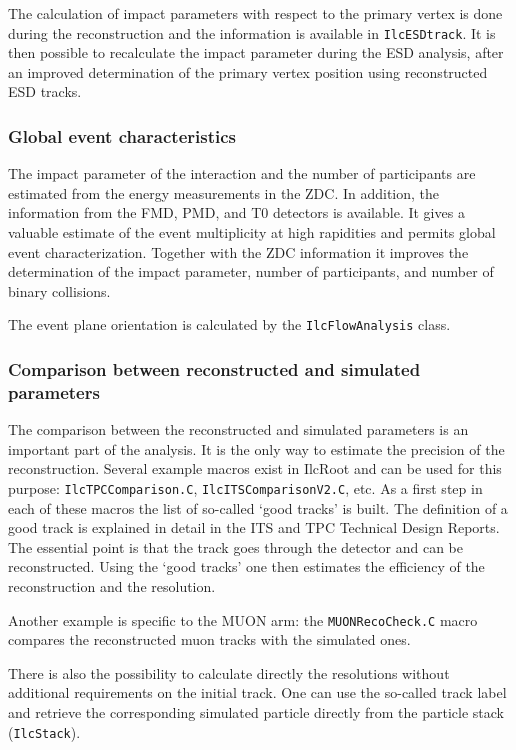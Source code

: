 \documentclass[12pt,a4paper,twoside]{article}
\makeatletter
\newcommand {\ilcroot} {IlcRoot\@\xspace}
\makeatother
\begin{document}
{The calculation of impact parameters with respect to the primary vertex
is done during the reconstruction and the information is available in
\texttt{IlcESDtrack}. It is then possible to recalculate the
impact parameter during the ESD analysis, after an improved determination
of the primary vertex position using reconstructed ESD tracks.

\subsubsection{Global event characteristics}

The impact parameter of the interaction and the number of participants
are estimated from the energy measurements in the ZDC. In addition,
the information  from the FMD, PMD, and T0 detectors is available. It
gives a valuable estimate of the event multiplicity at high rapidities
and permits global event characterization. Together with the ZDC
information it improves the determination of the impact parameter,
number of participants, and number of binary collisions.

The event plane orientation is calculated by the \texttt{IlcFlowAnalysis} class.

\subsubsection{Comparison between reconstructed and simulated parameters}

The comparison between the reconstructed and simulated parameters is
an important part of the analysis. It is the only way to estimate the
precision of the reconstruction. Several example macros exist in
\ilcroot and can be used for this purpose: \texttt{IlcTPCComparison.C},
\texttt{IlcITSComparisonV2.C}, etc. As a first step in each of these
macros the list of so-called `good tracks' is built. The definition of
a good track is explained in detail in the ITS\cite{CH6Ref:ITS_TDR} and 
TPC\cite{CH6Ref:TPC_TDR} Technical Design
Reports.  The essential point is that the track
goes through the detector and can be reconstructed. Using the `good
tracks' one then estimates the efficiency of the reconstruction and
the resolution.

Another example is specific to the MUON arm: the \texttt{MUONRecoCheck.C}
macro compares the reconstructed muon tracks with the simulated ones.

There is also the possibility to calculate directly the resolutions without
additional requirements on the initial track. One can use the
so-called track label and retrieve the corresponding simulated
particle directly from the particle stack (\texttt{IlcStack}).

}
\end{document}
